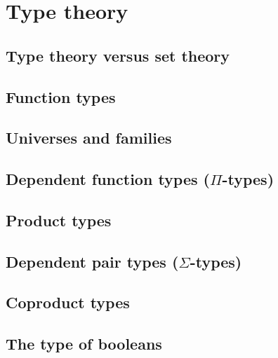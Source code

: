 \chapter{Type theory}
\label{cha:typetheory}

\section{Type theory versus set theory}
\label{sec:types-vs-sets}


\section{Function types}
\label{sec:function-types}


\section{Universes and families}
\label{sec:universes}


\section{Dependent function types (\texorpdfstring{$\Pi$}{Π}-types)}
\label{sec:pi-types}


\section{Product types}
\label{sec:finite-product-types}


\section{Dependent pair types (\texorpdfstring{$\Sigma$}{Σ}-types)}
\label{sec:sigma-types}


\section{Coproduct types}
\label{sec:coproduct-types}


\section{The type of booleans}
\label{sec:type-booleans}


